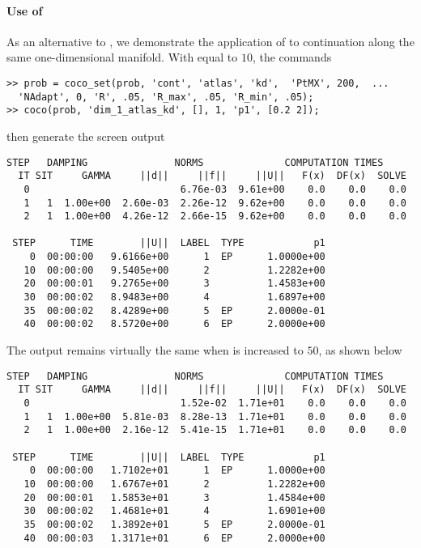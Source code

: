 \paragraph{Use of }
As an alternative to , we demonstrate the application of  to continuation along the same one-dimensional manifold. With  equal to $10$, the commands
\begin{lstlisting}[language=coco-highlight]
>> prob = coco_set(prob, 'cont', 'atlas', 'kd',  'PtMX', 200,  ...
  'NAdapt', 0, 'R', .05, 'R_max', .05, 'R_min', .05);
>> coco(prob, 'dim_1_atlas_kd', [], 1, 'p1', [0.2 2]);
\end{lstlisting}
then generate the screen output
\begin{lstlisting}[language=coco-highlight]
    STEP   DAMPING               NORMS              COMPUTATION TIMES
  IT SIT     GAMMA     ||d||     ||f||     ||U||   F(x)  DF(x)  SOLVE
   0                          6.76e-03  9.61e+00    0.0    0.0    0.0
   1   1  1.00e+00  2.60e-03  2.26e-12  9.62e+00    0.0    0.0    0.0
   2   1  1.00e+00  4.26e-12  2.66e-15  9.62e+00    0.0    0.0    0.0

 STEP      TIME        ||U||  LABEL  TYPE            p1
    0  00:00:00   9.6166e+00      1  EP      1.0000e+00
   10  00:00:00   9.5405e+00      2          1.2282e+00
   20  00:00:01   9.2765e+00      3          1.4583e+00
   30  00:00:02   8.9483e+00      4          1.6897e+00
   35  00:00:02   8.4289e+00      5  EP      2.0000e-01
   40  00:00:02   8.5720e+00      6  EP      2.0000e+00
\end{lstlisting}
The output remains virtually the same when  is increased to $50$, as shown below
\begin{lstlisting}[language=coco-highlight]
    STEP   DAMPING               NORMS              COMPUTATION TIMES
  IT SIT     GAMMA     ||d||     ||f||     ||U||   F(x)  DF(x)  SOLVE
   0                          1.52e-02  1.71e+01    0.0    0.0    0.0
   1   1  1.00e+00  5.81e-03  8.28e-13  1.71e+01    0.0    0.0    0.0
   2   1  1.00e+00  2.16e-12  5.41e-15  1.71e+01    0.0    0.0    0.0

 STEP      TIME        ||U||  LABEL  TYPE            p1
    0  00:00:00   1.7102e+01      1  EP      1.0000e+00
   10  00:00:00   1.6767e+01      2          1.2282e+00
   20  00:00:01   1.5853e+01      3          1.4584e+00
   30  00:00:02   1.4681e+01      4          1.6901e+00
   35  00:00:02   1.3892e+01      5  EP      2.0000e-01
   40  00:00:03   1.3171e+01      6  EP      2.0000e+00
\end{lstlisting}
